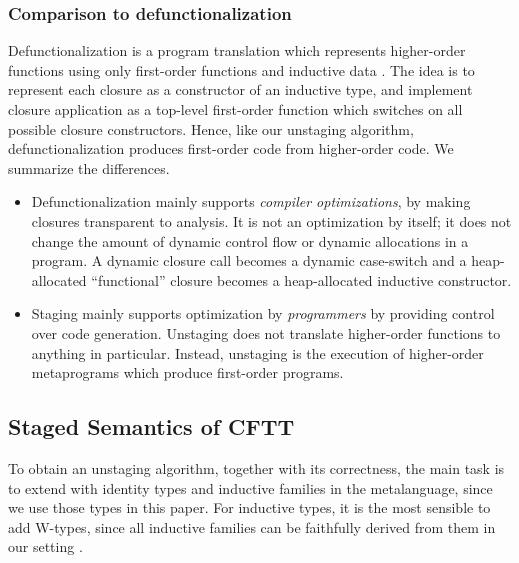 \documentclass[acmsmall,screen]{acmart}
\theoremstyle{remark}
\begin{document}
\subsubsection{Comparison to defunctionalization}
Defunctionalization is a program translation which represents higher-order
functions using only first-order functions and inductive data
\cite{DBLP:journals/lisp/Reynolds98a,DBLP:conf/ppdp/DanvyN01}. The idea is to
represent each closure as a constructor of an inductive type, and implement
closure application as a top-level first-order function which switches on all
possible closure constructors. Hence, like our unstaging algorithm,
defunctionalization produces first-order code from higher-order code. We summarize
the differences.
\begin{itemize}
\item Defunctionalization mainly supports \emph{compiler optimizations}, by making
  closures transparent to analysis. It is not an optimization by itself; it does
  not change the amount of dynamic control flow or dynamic allocations in a
  program. A dynamic closure call becomes a dynamic case-switch and a
  heap-allocated ``functional'' closure becomes a heap-allocated inductive
  constructor.
\item Staging mainly supports optimization by \emph{programmers} by providing
  control over code generation. Unstaging does not translate higher-order
  functions to anything in particular. Instead, unstaging is the execution of
  higher-order metaprograms which produce first-order programs.
\end{itemize}

\subsection{Staged Semantics of CFTT}\label{sec:semantics-of-staging}

To obtain an unstaging algorithm, together with its correctness, the main task
is to extend \cite{staged2ltt} with identity types and inductive families in the
metalanguage, since we use those types in this paper. For inductive types, it is the
most sensible to add W-types, since all inductive families can be faithfully
derived from them in our setting \cite{whynotw}.
\end{document}
